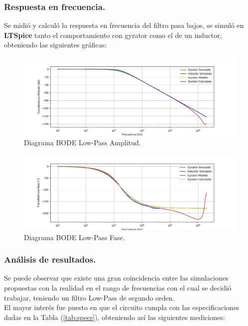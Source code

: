 \subsubsection{Respuesta en frecuencia.}

Se midió y calculó la respuesta en frecuencia del filtro pasa bajos, se simuló en \textbf{LTSpice} tanto el comportamiento con gyrator como el de un inductor, obteniendo las siguientes gráficas:
\begin{figure}[H]	
	\centering
	\includegraphics[width=\textwidth]{ImagenesEj2/bodelp.jpg}
	\caption{Diagrama BODE Low-Pass Amplitud.}
	\label{fig:bodelp}
\end{figure}
\begin{figure}[H]	
	\centering
	\includegraphics[width=\textwidth]{ImagenesEj2/bodelpp.jpg}
	\caption{Diagrama BODE Low-Pass Fase.}
	\label{fig:bodelpp}
\end{figure}
\subsubsection{Análisis de resultados.}

Se puede observar que existe una gran coincidencia entre las simulaciones propuestas con la realidad en el rango de frecuencias con el cual se decidió trabajar, teniendo un filtro Low-Pass de segundo orden.\\
El mayor interés fue puesto en que el circuito cumpla con las especificaciones dadas en la Tabla (\ref{tab:specs}), obteniendo así las siguientes mediciones:

